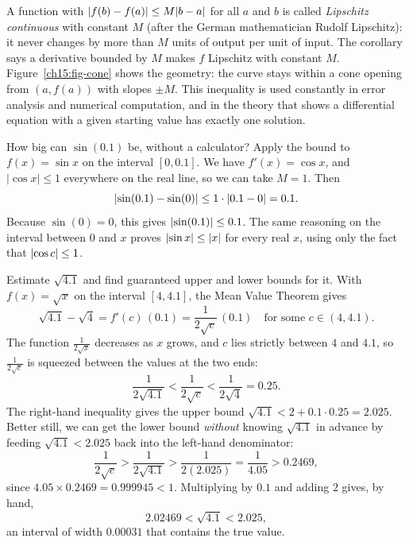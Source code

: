 A function with $\lvert f(b)-f(a)\rvert\le M\lvert b-a\rvert$ for all $a$ and $b$ is called
\emph{Lipschitz continuous} with constant $M$ (after the German mathematician Rudolf
Lipschitz): it never changes by more than $M$ units of output per unit of input. The
corollary says a derivative bounded by $M$ makes $f$ Lipschitz with constant $M$.
Figure~\ref{ch15:fig-cone} shows the geometry:
the curve stays within a cone opening from $(a,f(a))$ with slopes $\pm M$.
This inequality is used constantly in error analysis and numerical computation, and in
the theory that shows a differential equation with a given starting value has exactly
one solution.

\begin{example}\label{ch15:ex-sin-bound}
How big can $\sin(0.1)$ be, without a calculator? Apply the bound to $f(x)=\sin x$ on
the interval $[0,0.1]$. We have $f'(x)=\cos x$, and $|\cos x|\le 1$ everywhere on the
real line, so we can take $M=1$. Then
\[
  \lvert\sin(0.1)-\sin(0)\rvert\le 1\cdot\lvert0.1-0\rvert=0.1.
\]
Because $\sin(0)=0$, this gives $\lvert\sin(0.1)\rvert\le 0.1$. The same
reasoning on the interval between $0$ and $x$ proves $\lvert\sin x\rvert\le \lvert x\rvert$ for
every real $x$, using only the fact that $\lvert\cos c\rvert\le 1$.
\end{example}

\begin{example}\label{ch15:ex-sqrt-bound}
Estimate $\sqrt{4.1}$ and find guaranteed upper and lower bounds for it.
With $f(x)=\sqrt x$ on the interval $[4,4.1]$, the Mean Value Theorem gives
\[
  \sqrt{4.1}-\sqrt 4=f'(c)\,(0.1)=\frac{1}{2\sqrt c}\,(0.1)
  \quad\text{for some }c\in(4,4.1).
\]
The function $\frac{1}{2\sqrt x}$ decreases as $x$ grows, and $c$ lies strictly between
$4$ and $4.1$, so $\frac{1}{2\sqrt c}$ is squeezed between the values at the two ends:
\[
  \frac{1}{2\sqrt{4.1}} < \frac{1}{2\sqrt c} < \frac{1}{2\sqrt 4} = 0.25.
\]
The right-hand inequality gives the upper bound
$\sqrt{4.1} < 2 + 0.1\cdot 0.25 = 2.025$. Better still, we can get the lower bound
\emph{without} knowing $\sqrt{4.1}$ in advance by feeding $\sqrt{4.1}<2.025$ back into
the left-hand denominator:
\[
  \frac{1}{2\sqrt c} > \frac{1}{2\sqrt{4.1}} > \frac{1}{2(2.025)} = \frac{1}{4.05} > 0.2469,
\]
since $4.05\times 0.2469 = 0.999945 < 1$. Multiplying by $0.1$ and adding $2$ gives,
by hand,
\[
  2.02469 < \sqrt{4.1} < 2.025,
\]
an interval of width $0.00031$ that contains the true value.
\end{example}

